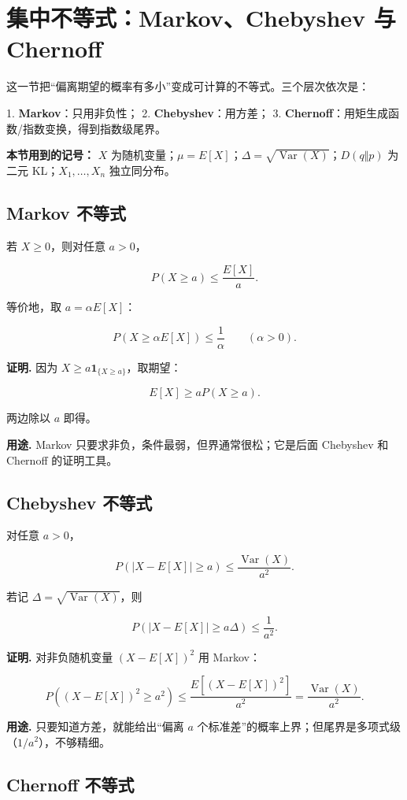 \section{集中不等式：Markov、Chebyshev 与 Chernoff}


这一节把“偏离期望的概率有多小”变成可计算的不等式。三个层次依次是：

1. \textbf{Markov}：只用非负性；
2. \textbf{Chebyshev}：用方差；
3. \textbf{Chernoff}：用矩生成函数/指数变换，得到指数级尾界。

\textbf{本节用到的记号：} $X$ 为随机变量；$\mu=E[X]$；$\Delta=\sqrt{\operatorname{Var}(X)}$；$D(q\Vert p)$ 为二元 KL；$X_1,\dots,X_n$ 独立同分布。

\subsection{Markov 不等式}


若 $X\ge0$，则对任意 $a>0$，

\[
\boxed{
P(X\ge a)\le\frac{E[X]}{a}
}.
\]

等价地，取 $a=\alpha E[X]$：

\[
P(X\ge\alpha E[X])\le\frac1\alpha\qquad(\alpha>0).
\]

\textbf{证明.} 因为 $X\ge a\mathbf 1_{\{X\ge a\}}$，取期望：

\[
E[X]\ge aP(X\ge a).
\]

两边除以 $a$ 即得。

\textbf{用途.} Markov 只要求非负，条件最弱，但界通常很松；它是后面 Chebyshev 和 Chernoff 的证明工具。

\subsection{Chebyshev 不等式}


对任意 $a>0$，

\[
\boxed{
P(|X-E[X]|\ge a)\le\frac{\operatorname{Var}(X)}{a^2}
}.
\]

若记 $\Delta=\sqrt{\operatorname{Var}(X)}$，则

\[
P(|X-E[X]|\ge a\Delta)\le\frac1{a^2}.
\]

\textbf{证明.} 对非负随机变量 $(X-E[X])^2$ 用 Markov：

\[
P((X-E[X])^2\ge a^2)
\le\frac{E[(X-E[X])^2]}{a^2}
=\frac{\operatorname{Var}(X)}{a^2}.
\]

\textbf{用途.} 只要知道方差，就能给出“偏离 $a$ 个标准差”的概率上界；但尾界是多项式级（$1/a^2$），不够精细。

\subsection{Chernoff 不等式}


